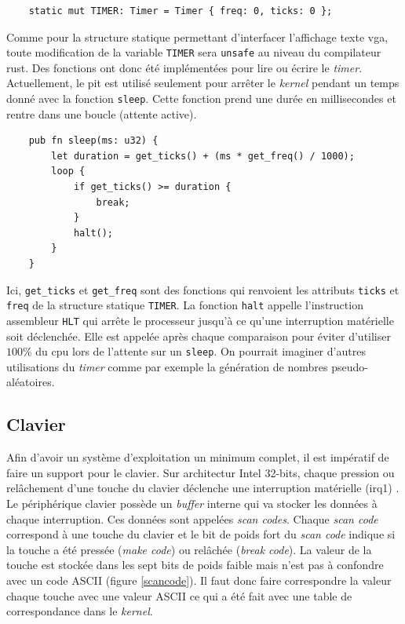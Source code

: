\begin{verbatim}
    static mut TIMER: Timer = Timer { freq: 0, ticks: 0 };
\end{verbatim}

Comme pour la structure statique permettant d'interfacer l'affichage texte \acrshort{vga},
toute modification de la variable \texttt{TIMER} sera \texttt{unsafe}
au niveau du compilateur rust. Des fonctions ont donc été implémentées pour lire
ou écrire le \textit{timer}. Actuellement, le \acrshort{pit} est utilisé seulement
pour arrêter le \textit{kernel} pendant un temps donné avec la fonction \texttt{sleep}.
Cette fonction prend une durée en millisecondes et rentre dans une boucle (attente
active).

\begin{verbatim}
    pub fn sleep(ms: u32) {
        let duration = get_ticks() + (ms * get_freq() / 1000);
        loop {
            if get_ticks() >= duration {
                break;
            }
            halt();
        }
    }
\end{verbatim}

Ici, \texttt{get_ticks} et \texttt{get_freq} sont des fonctions
qui renvoient les attributs \texttt{ticks} et \texttt{freq}
de la structure statique \texttt{TIMER}. La fonction \texttt{halt}
appelle l'instruction assembleur \texttt{HLT} qui arrête le processeur
jusqu'à ce qu'une interruption matérielle soit déclenchée. Elle est appelée après
chaque comparaison pour éviter d'utiliser $100\%$ du \acrshort{cpu} lors de l'attente
sur un \texttt{sleep}. On pourrait imaginer d'autres utilisations du
\textit{timer} comme par exemple la génération de nombres pseudo-aléatoires.


\subsection{Clavier}
Afin d'avoir un système d'exploitation un minimum complet, il est impératif
de faire un support pour le clavier. Sur architectur Intel 32-bits, chaque
pression ou relâchement d'une touche du clavier déclenche une interruption
matérielle (\acrshort{irq}1) \cite{ref42}. Le périphérique clavier possède un
\textit{buffer} interne qui va stocker les données à chaque interruption. Ces données
sont appelées \textit{scan codes}. Chaque \textit{scan code} correspond à une
touche du clavier et le bit de poids fort du \textit{scan code} indique si
la touche a été pressée (\textit{make code}) ou relâchée (\textit{break code}).
La valeur de la touche est stockée dans les sept bits de poids faible mais n'est
pas à confondre avec un code ASCII (figure \ref{scancode}). Il faut donc faire
correspondre la valeur chaque touche avec une valeur ASCII ce qui a été fait avec
une table de correspondance dans le \textit{kernel}.

